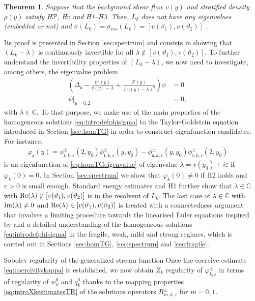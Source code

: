 \documentclass[11pt,reqno]{amsproc}
\makeatletter
\renewcommand\subsection{\@startsection{subsection}{2}%
\normalparindent{.5\linespacing\@plus.7\linespacing}{-.5em}
{\normalfont\bfseries}}
\newtheorem{theorem}[proposition]{Theorem}
\theoremstyle{definition}
\numberwithin{equation}{section}
\newcommand{\C}{{\mathbb C}}
\newcommand{\sr}{{\mathsf{r}}}
\newcommand{\s}{{\mathsf{s}}}
\newcommand{\ep}{\varepsilon}
\renewcommand{\P}{{\mathcal{P}}}
\def\Re{{\rm Re}}
\def\Im{{\rm Im}}
\makeatother
\begin{document}
\begin{theorem}\label{thm:spectrumlinop}
Suppose that the background shear flow $v(y)$ and stratified density $\overline{\rho}(y)$ satisfy {H$\P$, H$v$} and H1--H3. Then, $L_k$ does not have any eigenvalues (embedded or not) and $\sigma(L_k) = \sigma_{ess}(L_k)=[v(\vartheta_1), v(\vartheta_2)]$ .
\end{theorem}
Its proof is presented in Section \ref{sec:spectrum} and consists in showing that $(L_k - \lambda)$ is continuously invertible for all $\lambda\not \in [v(\vartheta_1), v(\vartheta_2)]$. To further understand the invertibility properties of $(L_k - \lambda)$, we now need to investigate, among others, the eigenvalue problem
\begin{align}
\left( \Delta_k - \frac{v''(y)}{v(y) - \lambda} + \frac{\P(y)}{(v(y) - \lambda)^2} \right)\psi &= 0\label{eq:homTGeigenvalue} \\
\psi|_{y=0,2} &=0,
\end{align}
with $\lambda\in \C$. To that purpose, we make use of the main properties of the homogeneous solutions \eqref{eq:introdefphisigma}  to the Taylor-Goldstein equation introduced in Section \ref{sec:homTG} in order to construct eigenfunction candidates. For instance, 
\begin{align*}
\varphi_k(y) = \phi_{\s,k,\ep}^\pm(2,y_0)\phi_{\sr,k,\ep}^\pm(y,y_0) - \phi_{\s,k,\ep}^\pm(y,y_0)\phi_{\sr,k,\ep}^\pm(2,y_0) 
\end{align*}
is an eigenfunction of \eqref{eq:homTGeigenvalue} of eigenvalue $\lambda = v(y_0) \mp i\ep$ if $\varphi_k(0)=0$. In Section \ref{sec:spectrum} we show that $\varphi_k(0)\neq 0$ if H2 holds and $\ep>0$ is small enough. Standard energy estimates and H1 further show that $\lambda\in \C$ with $\Re(\lambda)\not \in [v(\vartheta_1),v(\vartheta_2)]$ is in the resolvent of $L_k$. The last case of $\lambda\in \C$ with $\Im(\lambda)\neq 0$ and $\Re(\lambda)\in [v(\vartheta_1),v(\vartheta_2)]$ is treated with a connectedness argument that involves a limiting procedure towards the linearised Euler equations inspired by \cite{sinambela2025transition} and a detailed understanding of the homogeneous solutions \eqref{eq:introdefphisigma} in the fragile, weak, mild and strong regimes, which is carried out in Sections \ref{sec:homTG}, \ref{sec:spectrum} and \ref{sec:fragile}.


\subsection{Sobolev regularity of the generalized stream-function}
Once the coercive estimate \eqref{eq:coercivitykappa} is established, we now obtain $Z_k$ regularity of $\varphi_{k,\ep}^\pm$ in terms of regularity of $w_k^0$ and $q_k^0$ thanks to the mapping properties \eqref{eq:introXkestimatesTR} of the solutions operators $R_{m,k,\ep}^\pm$ for $m=0,1$. 
\end{document}
